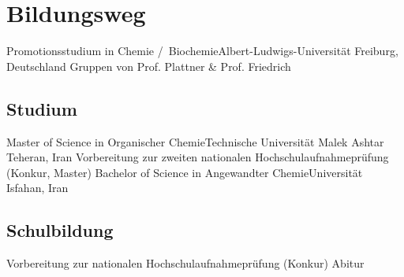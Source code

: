 
\section{Bildungsweg}
         {Promotionsstudium in Chemie \slash  ~Biochemie}{Albert-Ludwigs-Universität Freiburg, Deutschland \newline Gruppen von Prof. Plattner \& Prof. Friedrich}{}{}{}
    \subsection{Studium}
         {Master of Science in Organischer Chemie}{Technische Universität Malek Ashtar Teheran, Iran}{}{}{}
         {Vorbereitung zur zweiten nationalen Hochschulaufnahmeprüfung (Konkur, Master)}{}{}{}{}
         {Bachelor of Science in Angewandter Chemie}{Universität Isfahan, Iran}{}{}{}

    \subsection{Schulbildung}
         {Vorbereitung zur nationalen Hochschulaufnahmeprüfung (Konkur)}{}{}{}{}
         {Abitur}{
        }{}{}{}


